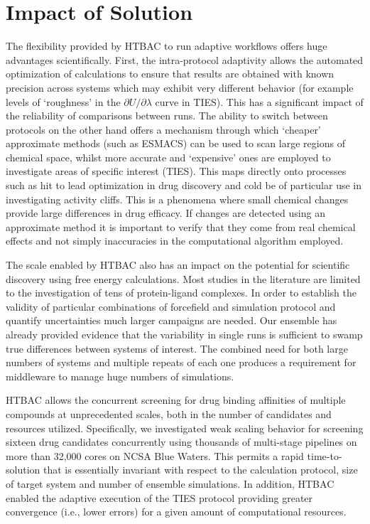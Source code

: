 \documentclass[conference]{IEEEtran}
\begin{document}
\section{Impact of Solution}\label{sec:impact}


The flexibility provided by HTBAC to run adaptive workflows offers huge advantages scientifically.
First, the intra-protocol adaptivity allows the automated optimization of calculations to ensure that
results are obtained with known precision across systems which may exhibit very different behavior (for example levels of `roughness' in the $\partial U/\partial\lambda$ curve in TIES).
This has a significant impact of the reliability of comparisons between runs.
The ability to switch between protocols on the other hand offers a mechanism through which `cheaper' approximate methods (such as ESMACS) can be used to scan large regions of chemical space, whilst more accurate and `expensive' ones are employed to investigate areas of specific interest (TIES).
This maps directly onto processes such as hit to lead optimization in drug discovery and cold be of particular use in investigating activity cliffs.
This is a phenomena where small chemical changes provide large differences in drug efficacy.
If changes are detected using an approximate method it is important to verify that they come from
real chemical effects and not simply inaccuracies in the computational algorithm employed.

The scale enabled by HTBAC also has an impact on the potential for scientific discovery using free energy calculations.
Most studies in the literature are limited to the investigation of tens of protein-ligand complexes.
In order to establish the validity of particular combinations of forcefield and simulation protocol and
quantify uncertainties much larger campaigns are needed.
Our ensemble has already provided evidence that the variability in single runs is sufficient to
swamp true differences between systems of interest.
The combined need for both large numbers of systems and multiple repeats of each one produces a requirement
for middleware to manage huge numbers of simulations.

HTBAC allows the concurrent screening
for drug binding affinities of multiple compounds at unprecedented scales,
both in the number of candidates and resources utilized. Specifically, we
investigated weak scaling behavior for screening sixteen drug candidates
concurrently using thousands of multi-stage pipelines on more than 32,000
cores on NCSA Blue Waters. This permits a rapid time-to-solution that is
essentially invariant with respect to the calculation protocol,
size of target system and number of ensemble simulations. In addition,
HTBAC enabled the adaptive execution of the TIES protocol
providing greater convergence (i.e., lower errors) for a given amount of
computational resources.
\end{document}
